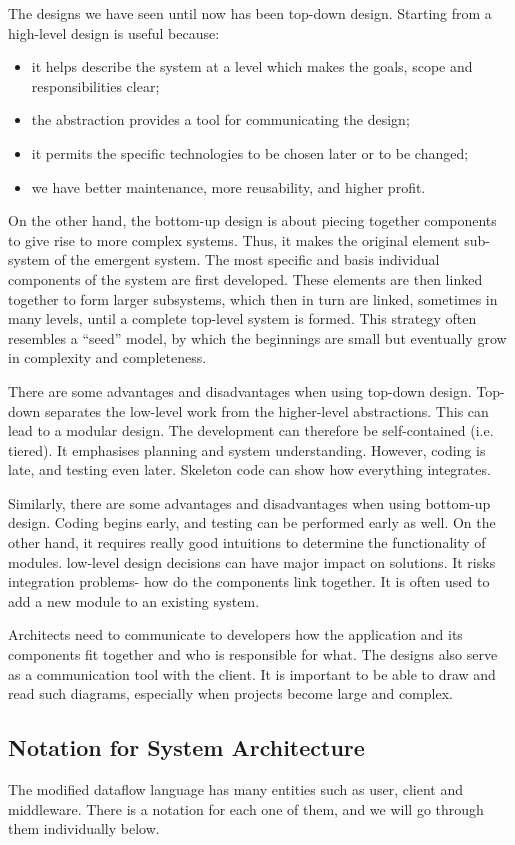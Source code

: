 \documentclass[a4paper, openany]{memoir}
\begin{document}
The designs we have seen until now has been top-down design. Starting from a high-level design is useful because:
\begin{itemize}
    \item it helps describe the system at a level which makes the goals, scope and responsibilities clear;
    \item the abstraction provides a tool for communicating the design;
    \item it permits the specific technologies to be chosen later or to be changed;
    \item we have better maintenance, more reusability, and higher profit.
\end{itemize}
On the other hand, the bottom-up design is about piecing together components to give rise to more complex systems. Thus, it makes the original element sub-system of the emergent system. The most specific and basis individual components of the system are first developed. These elements are then linked together to form larger subsystems, which then in turn are linked, sometimes in many levels, until a complete top-level system is formed. This strategy often resembles a ``seed'' model, by which the beginnings are small but eventually grow in complexity and completeness.

There are some advantages and disadvantages when using top-down design. Top-down separates the low-level work from the higher-level abstractions. This can lead to a modular design. The development can therefore be self-contained (i.e. tiered). It emphasises planning and system understanding. However, coding is late, and testing even later. Skeleton code can show how everything integrates.

Similarly, there are some advantages and disadvantages when using bottom-up design. Coding begins early, and testing can be performed early as well. On the other hand, it requires really good intuitions to determine the functionality of modules. low-level design decisions can have major impact on solutions. It risks integration problems- how do the components link together. It is often used to add a new module to an existing system.

Architects need to communicate to developers how the application and its components fit together and who is responsible for what. The designs also serve as a communication tool with the client. It is important to be able to draw and read such diagrams, especially when projects become large and complex.

\subsection{Notation for System Architecture}
The modified dataflow language has many entities such as user, client and middleware. There is a notation for each one of them, and we will go through them individually below.
\end{document}

